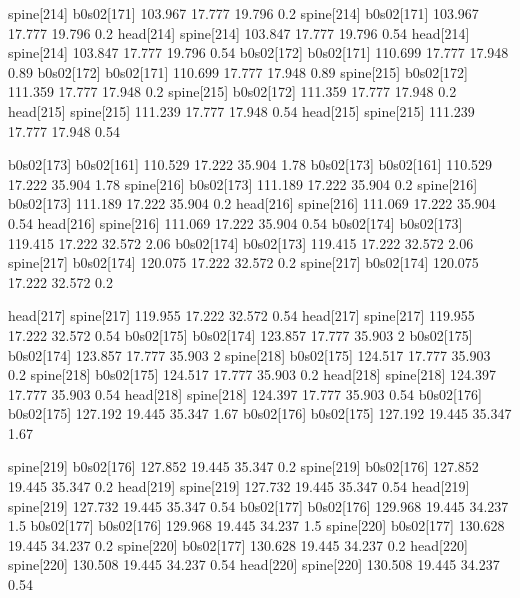spine[214]    b0s02[171]    103.967    17.777    19.796    0.2
spine[214]    b0s02[171]    103.967    17.777    19.796    0.2
head[214]    spine[214]    103.847    17.777    19.796    0.54
head[214]    spine[214]    103.847    17.777    19.796    0.54
b0s02[172]    b0s02[171]    110.699    17.777    17.948    0.89
b0s02[172]    b0s02[171]    110.699    17.777    17.948    0.89
spine[215]    b0s02[172]    111.359    17.777    17.948    0.2
spine[215]    b0s02[172]    111.359    17.777    17.948    0.2
head[215]    spine[215]    111.239    17.777    17.948    0.54
head[215]    spine[215]    111.239    17.777    17.948    0.54


b0s02[173]    b0s02[161]    110.529    17.222    35.904    1.78
b0s02[173]    b0s02[161]    110.529    17.222    35.904    1.78
spine[216]    b0s02[173]    111.189    17.222    35.904    0.2
spine[216]    b0s02[173]    111.189    17.222    35.904    0.2
head[216]    spine[216]    111.069    17.222    35.904    0.54
head[216]    spine[216]    111.069    17.222    35.904    0.54
b0s02[174]    b0s02[173]    119.415    17.222    32.572    2.06
b0s02[174]    b0s02[173]    119.415    17.222    32.572    2.06
spine[217]    b0s02[174]    120.075    17.222    32.572    0.2
spine[217]    b0s02[174]    120.075    17.222    32.572    0.2


head[217]    spine[217]    119.955    17.222    32.572    0.54
head[217]    spine[217]    119.955    17.222    32.572    0.54
b0s02[175]    b0s02[174]    123.857    17.777    35.903    2
b0s02[175]    b0s02[174]    123.857    17.777    35.903    2
spine[218]    b0s02[175]    124.517    17.777    35.903    0.2
spine[218]    b0s02[175]    124.517    17.777    35.903    0.2
head[218]    spine[218]    124.397    17.777    35.903    0.54
head[218]    spine[218]    124.397    17.777    35.903    0.54
b0s02[176]    b0s02[175]    127.192    19.445    35.347    1.67
b0s02[176]    b0s02[175]    127.192    19.445    35.347    1.67


spine[219]    b0s02[176]    127.852    19.445    35.347    0.2
spine[219]    b0s02[176]    127.852    19.445    35.347    0.2
head[219]    spine[219]    127.732    19.445    35.347    0.54
head[219]    spine[219]    127.732    19.445    35.347    0.54
b0s02[177]    b0s02[176]    129.968    19.445    34.237    1.5
b0s02[177]    b0s02[176]    129.968    19.445    34.237    1.5
spine[220]    b0s02[177]    130.628    19.445    34.237    0.2
spine[220]    b0s02[177]    130.628    19.445    34.237    0.2
head[220]    spine[220]    130.508    19.445    34.237    0.54
head[220]    spine[220]    130.508    19.445    34.237    0.54


